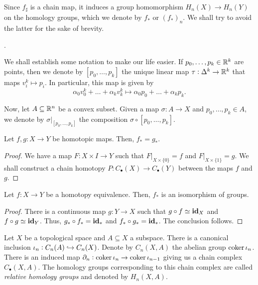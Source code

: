 Since $f_\sharp$ is a chain map, it induces a group homomorphism $H_n(X)\to H_n(Y)$ on the homology groups, which we denote by $f_\ast$ or $(f_\ast)_n$. We shall try to avoid the latter for the sake of brevity.

.

\begin{mdframed}
    We shall establish some notation to make our life easier. If $p_0,\dots,p_k\in\mathbb{R}^k$ are points, then we denote by $[p_0,\dots,p_k]$ the unique linear map $\tau:\Delta^k\to\mathbb{R}^k$ that maps $v^k_i\mapsto p_i$. In particular, this map is given by 
    \begin{equation*}
        \alpha_0 v^k_0 + \dots + \alpha_kv^k_k\mapsto \alpha_0p_0 + \dots + \alpha_{k}p_k.
    \end{equation*}

    Now, let $A\subseteq\mathbb{R}^n$ be a convex subset. Given a map $\sigma: A\to X$ and $p_0,\dots,p_k\in A$, we denote by $\sigma|_{[p_0,\dots,p_k]}$ the composition $\sigma\circ[p_0,\dots,p_k]$.
\end{mdframed}

\begin{theorem}
    Let $f,g: X\to Y$ be homotopic maps. Then, $f_\ast = g_\ast$.
\end{theorem}
\begin{proof}
    We have a map $F: X\times I\to Y$ such that $F|_{X\times\{0\}} = f$ and $F|_{X\times\{1\}} = g$. We shall construct a chain homotopy $P: C_\bullet(X)\to C_\bullet(Y)$ between the maps $f$ and $g$. 
\end{proof}

\begin{corollary}
    Let $f: X\to Y$ be a homotopy equivalence. Then, $f_\ast$ is an isomorphism of groups.
\end{corollary}
\begin{proof}
    There is a continuous map $g: Y\to X$ such that $g\circ f\simeq\mathbf{id}_X$ and $f\circ g\simeq\mathbf{id}_Y$. Thus, $g_\ast\circ f_\ast = \mathbf{id}_\ast$ and $f_\ast\circ g_\ast = \mathbf{id}_\ast$. The conclusion follows.
\end{proof}

\begin{definition}
    Let $X$ be a topological space and $A\subseteq X$ a subspace. There is a canonical inclusion $\iota_n: C_n(A)\hookrightarrow C_n(X)$. Denote by $C_n(X,A)$ the abelian group $\operatorname{coker}\iota_n$. There is an induced map $\partial_n:\operatorname{coker}\iota_n\to\operatorname{coker}\iota_{n - 1}$ giving us a chain complex $C_\bullet(X,A)$. The homology groups corresponding to this chain complex are called \emph{relative homology groups} and denoted by $H_n(X,A)$.
\end{definition}


